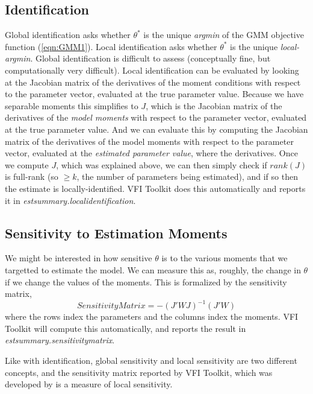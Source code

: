 \subsection{Identification}
Global identification asks whether $\theta^*$ is the unique \textit{argmin} of the GMM objective function (\ref{eqn:GMM1}). Local identification asks whether $\theta^*$ is the unique \textit{local-argmin}. Global identification is difficult to assess (conceptually fine, but computationally very difficult). Local identification can be evaluated by looking at the Jacobian matrix of the derivatives of the moment conditions with respect to the parameter vector, evaluated at the true parameter value. Because we have separable moments this simplifies to $J$, which is the Jacobian matrix of the derivatives of the \textit{model moments} with respect to the parameter vector, evaluated at the true parameter value. And we can evaluate this by computing the Jacobian matrix of the derivatives of the model moments with respect to the parameter vector, evaluated at the \textit{estimated parameter value}, where the derivatives. Once we compute $J$, which was explained above, we can then simply check if $rank(J)$ is full-rank (so $\geq k$, the number of parameters being estimated), and if so then the estimate is locally-identified. VFI Toolkit does this automatically and reports it in \textit{estsummary.localidentification}.


\subsection{Sensitivity to Estimation Moments}
We might be interested in how sensitive $\theta$ is to the various moments that we targetted to estimate the model. We can measure this as, roughly, the change in $\theta$ if we change the values of the moments. This is formalized by the sensitivity matrix,
$$SensitivityMatrix=-(J'WJ)^{-1} (J'W)$$
where the rows index the parameters and the columns index the moments. VFI Toolkit will compute this automatically, and reports the result in \textit{estsummary.sensitivitymatrix}.

Like with identification, global sensitivity and local sensitivity are two different concepts, and the sensitivity matrix reported by VFI Toolkit, which was developed by \cite*{AndrewsGentzkowShapiro2017} is a measure of local sensitivity.

